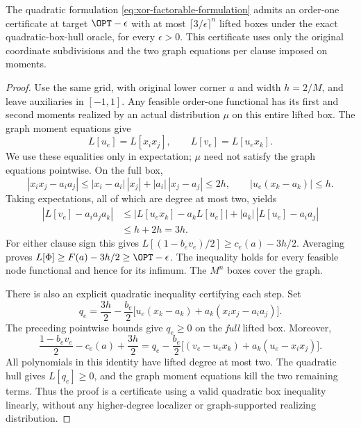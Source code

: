 \begin{proposition}
\label{prop:xor-order-one-upper}
The quadratic formulation \eqref{eq:xor-factorable-formulation} admits
an order-one certificate at target $\OPT-\epsilon$ with at most
$\lceil3/\epsilon\rceil^n$ lifted boxes under the exact quadratic-box-hull
oracle, for every $\epsilon>0$. This certificate uses only the original
coordinate subdivisions and the two graph equations per clause imposed
on moments.
\end{proposition}
\begin{proof}
Use the same grid, with original lower corner $a$ and width $h=2/M$,
and leave auxiliaries in $[-1,1]$. Any feasible order-one functional
has its first and second moments realized by an actual distribution $\mu$
on this entire lifted box. The graph moment equations give
\begin{equation}\label{eq:order-one-graph-moments}
 L[u_e]=L[x_ix_j],\qquad L[v_e]=L[u_ex_k].
\end{equation}
We use these equalities only in expectation; $\mu$ need not satisfy the
graph equations pointwise. On the full box,
\[
 |x_ix_j-a_ia_j|
 \le |x_i-a_i|\,|x_j|+|a_i|\,|x_j-a_j|\le2h,
 \qquad |u_e(x_k-a_k)|\le h.
\]
Taking expectations, all of which are degree at most two, yields
\begin{align}
 |L[v_e]-a_ia_ja_k|
 &\le |L[u_ex_k]-a_kL[u_e]|
          +|a_k|\,|L[u_e]-a_ia_j|\nonumber\\
 &\le h+2h=3h.\label{eq:order-one-corner-estimate}
\end{align}
For either clause sign this gives
$L[(1-b_ev_e)/2]\ge c_e(a)-3h/2$.
Averaging proves $L[\Phi]\ge F(a)-3h/2\ge\OPT-\epsilon$.
The inequality holds for every feasible node functional and hence for
its infimum. The $M^n$ boxes cover the graph.

There is also an explicit quadratic inequality certifying each step. Set
\begin{equation}\label{eq:order-one-quadratic-cut}
 q_e=\frac{3h}{2}-\frac{b_e}{2}
       \bigl[u_e(x_k-a_k)+a_k(x_ix_j-a_ia_j)\bigr].
\end{equation}
The preceding pointwise bounds give $q_e\ge0$ on the \emph{full} lifted
box. Moreover,
\begin{equation}\label{eq:order-one-cut-identity}
 \frac{1-b_ev_e}{2}-c_e(a)+\frac{3h}{2}
 =q_e-\frac{b_e}{2}
       \bigl[(v_e-u_ex_k)+a_k(u_e-x_ix_j)\bigr].
\end{equation}
All polynomials in this identity have lifted degree at most two. The
quadratic hull gives $L[q_e]\ge0$, and the graph moment equations kill
the two remaining terms. Thus the proof is a certificate using a valid
quadratic box inequality linearly, without any higher-degree localizer
or graph-supported realizing distribution.
\end{proof}

